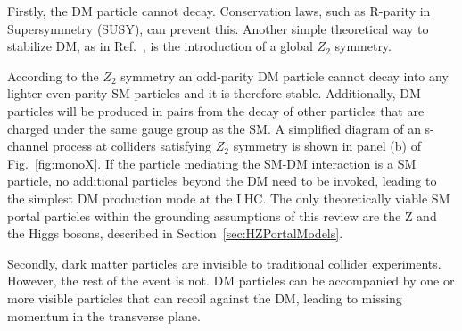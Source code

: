 Firstly, the DM particle cannot decay. Conservation laws, such as R-parity in Supersymmetry (SUSY),
can prevent this. Another simple theoretical way to stabilize DM, as in Ref.~\cite{Batell:2010bp}, 
is the introduction of a global $Z_2$ symmetry. 
\begin{marginnote}[]
\end{marginnote}
According to the $Z_2$ symmetry an odd-parity DM particle cannot decay into any 
lighter even-parity SM particles and it is therefore stable. 
Additionally, DM particles will be produced in pairs from the decay of other particles
that are charged under the same gauge group as the SM.
A simplified diagram of an s-channel process at colliders
satisfying $Z_2$ symmetry is shown in panel (b) of Fig.~\ref{fig:monoX}.
If the particle mediating the SM-DM interaction is a SM particle, no additional particles beyond the DM need to be invoked, leading to the simplest DM production mode at the LHC. The only theoretically viable SM portal particles within the grounding assumptions of this review are the Z and the Higgs bosons, described in Section~\ref{sec:HZPortalModels}. 


Secondly, dark matter particles are invisible to traditional collider experiments. 
However, the rest of the event is not. DM particles can be accompanied by one or more
visible particles that can recoil against the DM, leading to missing
momentum in the transverse plane. 

\begin{marginnote}[]
\end{marginnote}

